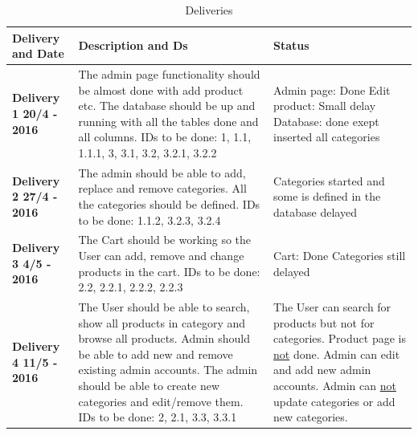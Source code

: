 \documentclass[a4paper,12pt]{article}
\begin{document}
\begin{table}[htbp]
	\centering
	\caption{Deliveries}
	\label{my-label}
	\begin{tabular}{|L{4cm}|L{7cm}|L{4cm}|}
		\hline
		\textbf{Delivery and Date}& \textbf{Description and Ds}                                                                                                                                                                                                                                                                                   & \textbf{Status} \\ \hline
		\textbf{Delivery 1  20/4 - 2016} & The admin page functionality should be almost done with add product etc. \newline The database should be up and running with all the tables done and all columns. \newline IDs to be done: 1, 1.1, 1.1.1, 3, 3.1, 3.2, 3.2.1, 3.2.2                                                                   &     Admin page: Done \newline Edit product: Small delay \newline Database: done exept inserted all categories            \\ \hline
		\textbf{Delivery 2 27/4 - 2016} & The admin should be able to add, replace and remove categories. \newline All the categories should be defined. \newline IDs to be done: 1.1.2, 3.2.3, 3.2.4                                                                                                                                            &  Categories started and some is defined in the database  delayed           \\ \hline
		\textbf{Delivery 3 4/5 - 2016}  & The Cart should be working so the User can add, remove and change products in the cart. \newline IDs to be done: 2.2, 2.2.1, 2.2.2, 2.2.3                                                                                                                                                      &  Cart: Done \newline Categories still delayed                \\ \hline
		\textbf{Delivery 4 11/5 - 2016} & The User should be able to search, show all products in category and browse all products. \newline Admin should be able to add new and remove existing admin accounts. \newline The admin should be able to create new categories and edit/remove them. \newline IDs to be done: 2, 2.1, 3.3, 3.3.1          &  The User can search for products but not for categories. \newline Product page is \underline{not} done. \newline Admin can edit and add new admin accounts. \newline Admin can \underline{not} update categories or add new categories.              \\ \hline

\end{tabular}
\end{table}
\end{document}
